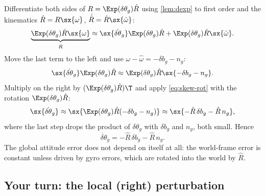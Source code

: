 \begin{example}
\label{ex:global-attitude}
Differentiate both sides of $R = \Exp(\delta\theta_g)\hat R$ using \cref{lem:dexp} to first order and the kinematics
$\dot R = R\sx{\omega}$, $\dot{\hat R} = \hat R\sx{\hat\omega}$:
\begin{equation*}
  \underbrace{\Exp(\delta\theta_g)\hat R\sx{\omega}}_{\dot R}
  \approx \sx{\dot{\delta\theta}_g}\Exp(\delta\theta_g)\hat R + \Exp(\delta\theta_g)\hat R\sx{\hat\omega}.
\end{equation*}
Move the last term to the left and use $\omega - \hat\omega = -\delta b_g - n_g$:
\begin{equation*}
  \sx{\dot{\delta\theta}_g}\Exp(\delta\theta_g)\hat R \approx \Exp(\delta\theta_g)\hat R\sx{-\delta b_g - n_g}.
\end{equation*}
Multiply on the right by $(\Exp(\delta\theta_g)\hat R)\T$ and apply \eqref{eq:skew-rot} with the rotation $\Exp(\delta\theta_g)\hat R$:
\begin{equation*}
  \sx{\dot{\delta\theta}_g} \approx \sx{\Exp(\delta\theta_g)\hat R(-\delta b_g - n_g)} \approx \sx{-\hat R\,\delta b_g - \hat R\, n_g},
\end{equation*}
where the last step drops the product of $\delta\theta_g$ with $\delta b_g$ and $n_g$, both small. Hence
\begin{equation}
  \dot{\delta\theta}_g = -\hat R\,\delta b_g - \hat R\,n_g .
\end{equation}
The global attitude error does not depend on itself at all: the world-frame error is constant unless driven by
gyro errors, which are rotated into the world by $\hat R$.
\end{example}

\subsection{Your turn: the local (right) perturbation}

